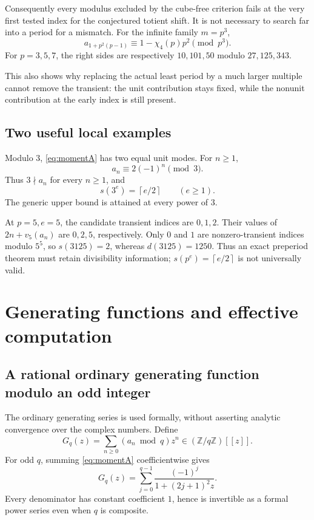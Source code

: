 \documentclass[11pt,a4paper]{article}
\numberwithin{equation}{section}
\theoremstyle{definition}
\newcommand{\Z}{\mathbb Z}
\newcommand{\ceil}[1]{\left\lceil #1\right\rceil}
\begin{document}
Consequently every modulus excluded by the cube-free criterion fails
at the very first tested index for the conjectured totient shift. It is
not necessary to search far into a period for a mismatch.
For the infinite family $m=p^3$,
\begin{equation}\label{eq:infinitefamily}
a_{1+p^2(p-1)}\equiv1-\chi_4(p)p^2\pmod{p^3}.
\end{equation}
For $p=3,5,7$, the right sides are respectively $10,101,50$ modulo
$27,125,343$.

This also shows why replacing the actual least period by a much larger
multiple cannot remove the transient: the unit contribution stays fixed,
while the nonunit contribution at the early index is still present.

\subsection{Two useful local examples}

Modulo $3$, \eqref{eq:momentA} has two equal unit modes. For $n\ge1$,
\begin{equation}\label{eq:mod3}
a_n\equiv2(-1)^n\pmod3.
\end{equation}
Thus $3\nmid a_n$ for every $n\ge1$, and
\[
s(3^e)=\ceil{e/2}\qquad(e\ge1).
\]
The generic upper bound is attained at every power of $3$.

At $p=5,e=5$, the candidate transient indices are $0,1,2$.
Their values of $2n+v_5(a_n)$ are $0,2,5$, respectively.
Only $0$ and $1$ are nonzero-transient indices modulo $5^5$, so
$s(3125)=2$, whereas $d(3125)=1250$.
Thus an exact preperiod theorem must retain divisibility information;
$s(p^e)=\ceil{e/2}$ is not universally valid.

\section{Generating functions and effective computation}
\label{sec:algorithms}

\subsection{A rational ordinary generating function modulo an odd integer}

The ordinary generating series is used formally, without asserting
analytic convergence over the complex numbers. Define
\[
G_q(z)=\sum_{n\ge0}(a_n\bmod q)z^n\in(\Z/q\Z)[[z]].
\]
For odd $q$, summing \eqref{eq:momentA} coefficientwise gives
\begin{equation}\label{eq:modgf}
G_q(z)=\sum_{j=0}^{q-1}\frac{(-1)^j}{1+(2j+1)^2z}.
\end{equation}
Every denominator has constant coefficient $1$, hence is invertible as
a formal power series even when $q$ is composite.
\end{document}
